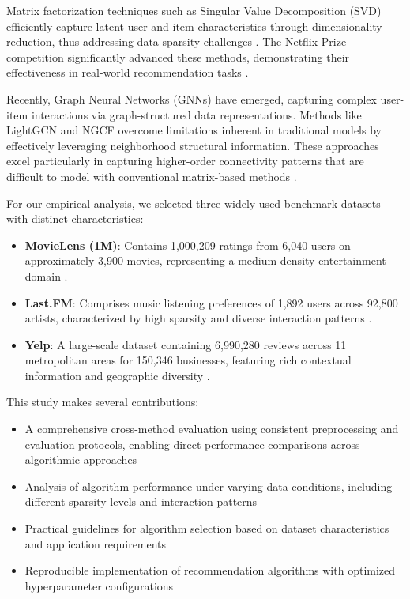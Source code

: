 \documentclass[sigconf,nonacm]{acmart} %
\begin{document}
Matrix factorization techniques such as Singular Value Decomposition (SVD) efficiently capture latent user and item characteristics through dimensionality reduction, thus addressing data sparsity challenges \cite{koren2009matrix}. The Netflix Prize competition significantly advanced these methods, demonstrating their effectiveness in real-world recommendation tasks \cite{bell2007lessons}.

Recently, Graph Neural Networks (GNNs) have emerged, capturing complex user-item interactions via graph-structured data representations. Methods like LightGCN \cite{he2020lightgcn} and NGCF \cite{wang2019neural} overcome limitations inherent in traditional models by effectively leveraging neighborhood structural information. These approaches excel particularly in capturing higher-order connectivity patterns that are difficult to model with conventional matrix-based methods \cite{wu2022graph}.

For our empirical analysis, we selected three widely-used benchmark datasets with distinct characteristics:  
\begin{itemize}  
    \item \textbf{MovieLens (1M)}: Contains 1,000,209 ratings from 6,040 users on approximately 3,900 movies, representing a medium-density entertainment domain \cite{movielens}.  
    \item \textbf{Last.FM}: Comprises music listening preferences of 1,892 users across 92,800 artists, characterized by high sparsity and diverse interaction patterns \cite{lastfm}.  
    \item \textbf{Yelp}: A large-scale dataset containing 6,990,280 reviews across 11 metropolitan areas for 150,346 businesses, featuring rich contextual information and geographic diversity \cite{yelp}.  
\end{itemize}  

This study makes several contributions:  
\begin{itemize}  
    \item A comprehensive cross-method evaluation using consistent preprocessing and evaluation protocols, enabling direct performance comparisons across algorithmic approaches  
    \item Analysis of algorithm performance under varying data conditions, including different sparsity levels and interaction patterns  
    \item Practical guidelines for algorithm selection based on dataset characteristics and application requirements  
    \item Reproducible implementation of recommendation algorithms with optimized hyperparameter configurations  
\end{itemize}  
\end{document}
